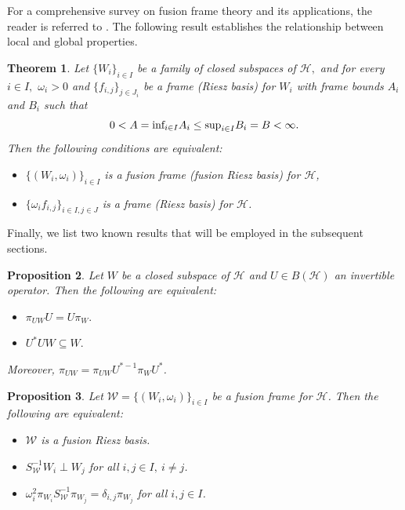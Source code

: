 \documentclass[sn-mathphys-num]{sn-jnl}%
\newtheorem{theorem}{Theorem}[section]
\newtheorem{proposition}[theorem]{Proposition}
\theoremstyle{definition}
\theoremstyle{remark}
\numberwithin{equation}{section}
\begin{document}
For a comprehensive survey on fusion frame theory and its applications, the reader is referred to \cite{Weaving Hilbert space, Norm retrieval algorithms,frame of subspace, 16, Excess 1,Nga,mitra sh.}. The following result establishes the relationship between local and global properties.

\begin{theorem}\label{Local theorem}
\cite{frame of subspace}  Let $\{W_{i}\}_{i \in I}$ be a family of closed subspaces of $\mathcal {H},$ and for every $i \in I,$ $ \omega _{i} >0 $ and $\{f_{i,j}\}_{j \in J_{i}}$ be a frame (Riesz basis) for $W_{i}$ with frame bounds $A_{i}$ and $B_{i}$ such that
\begin{equation*}
0 < A=\textnormal{inf}_{i \in I} A_{i}\leq \textnormal{sup}_{i \in I} B_{i}=B < \infty .
\end{equation*}
Then the following conditions are equivalent:
\begin{itemize}
\item[$(i)$] $\{(W_{i},\omega_{i})\}_{i \in I}$ is a fusion frame (fusion Riesz basis) for $\mathcal {H}$,
\item[$(ii)$] $\{\omega_{i}f_{i,j}\}_{i \in I, j \in J} $ is a frame (Riesz basis) for $\mathcal {H}$.
\end{itemize}
\end{theorem}


Finally, we list two known results that will be employed in the subsequent sections.
\begin{proposition}\cite{16} \label{Gavruta1} 
Let $W$ be a closed subspace of $\mathcal{H}$ and $U \in B(\mathcal{H})$ an invertible operator. Then the following are equivalent:
\begin{itemize}
\item[$(i)$] $\pi_{UW}U=U\pi_{W}.$
\item[$(ii)$]$U^{*}UW\subseteq W .$
\end{itemize}
Moreover, $\pi_{UW}=\pi_{UW}U^{*-1}\pi_{W}U^{*}$.
\end{proposition}

\begin{proposition}\cite{frame of subspace, mitra sh.} \label{mitra sh.} 
Let $\mathcal{W}=\{(W_{i},\omega_{i})\}_{i \in I} $ be a fusion frame for $\mathcal {H}$. Then the following are equivalent:
\begin{itemize}
\item[$(i)$] $\mathcal{W}$ is a fusion Riesz basis.
\item[$(ii)$] $S_{\mathcal{W}}^{-1}W_{i}\perp W_{j}$ for all $i , j \in I,~ i \neq j $.
\item[$(iii)$] $ \omega_{i}^{2}\pi_{W_{i}}S_{\mathcal{W}}^{-1}\pi_{W_{j}}=\delta_{i,j}\pi_{W_{j}}$ for all $i , j \in I $. 
\end{itemize}
\end{proposition}
\end{document}
